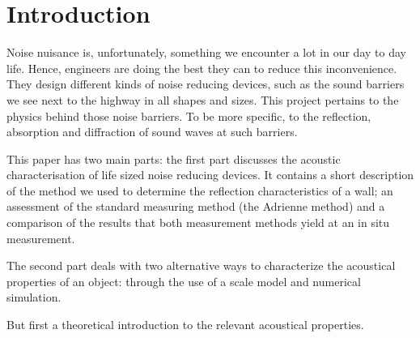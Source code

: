 \section{Introduction}
Noise nuisance is, unfortunately, something we encounter a lot in our day to day life. Hence, engineers are doing the best they can to reduce this inconvenience. They design different kinds of noise reducing devices, such as the sound barriers we see next to the highway in all shapes and sizes. 
This project pertains to the physics behind those noise barriers. To be more specific, to the reflection, absorption and diffraction of sound waves at such barriers.

This paper has two main parts: the first part discusses the acoustic characterisation of life sized noise reducing devices. It contains a short description of the method we used to determine the reflection characteristics of a wall; an assessment of the standard measuring method (the Adrienne method) and a comparison of the results that both measurement methods yield at an in situ measurement.

The second part deals with two alternative ways to characterize the acoustical properties of an object: through the use of a scale model and numerical simulation.

But first a theoretical introduction to the relevant acoustical properties.